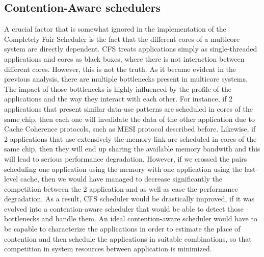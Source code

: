 \documentclass[diploma]{Styles/softlab-thesis}
\begin{document}
\subsection{Contention-Aware schedulers}

A crucial factor that is somewhat ignored in the implementation of the Completely Fair Scheduler is the fact that the different cores of a multicore system are directly dependent. CFS treats applications simply as single-threaded applications and cores as black boxes, where there is not interaction between different cores. However, this is not the truth. As it became evident in the previous analysis, there are multiple bottlenecks present in multicore systems. The impact of those bottlenecks is highly influenced by the profile of the applications and the way they interact with each other. For instance, if 2 applications that present similar data-use patterns are scheduled in cores of the same chip, then each one will invalidate the data of the other application due to Cache Coherence protocols, such as MESI protocol described before. Likewise, if 2 applications that use extensively the memory link are scheduled in cores of the same chip, then they will end up sharing the available memory bandwith and this will lead to serious performance degradation. However, if we crossed the pairs scheduling one application using the memory with one application using the last-level cache, then we would have managed to decrease significantly the competition between the 2 application and as well as ease the performance degradation. As a result, CFS scheduler would be drastically improved, if it was evolved into a contention-aware scheduler that would be able to detect those bottlenecks and handle them. An ideal contention-aware scheduler would have to be capable to characterize the applications in order to estimate the place of contention and then schedule the applications in suitable combinations, so that competition in system resources between application is minimized. \\
\end{document}
